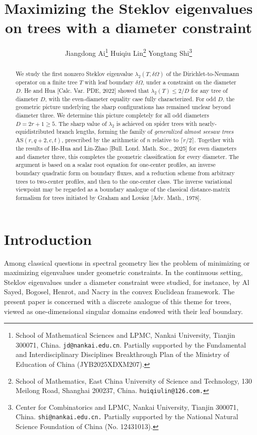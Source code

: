\documentclass[11pt]{article}
\title{Maximizing the Steklov eigenvalues on trees with a diameter constraint}
\author{
    Jiangdong Ai\thanks{School of Mathematical Sciences and LPMC, Nankai University, Tianjin 300071, China. {\tt jd@nankai.edu.cn}. Partially supported by the Fundamental and Interdisciplinary Disciplines Breakthrough Plan of the Ministry of Education of China (JYB2025XDXM207).}
    \hspace{2mm}
    Huiqiu Lin\thanks{School of Mathematics, East China University of Science and Technology, 130 Meilong Road, Shanghai 200237, China. {\tt{huiqiulin@126.com}.}}
    \hspace{2mm}
    Yongtang Shi\thanks{Center for Combinatorics and LPMC, Nankai University, Tianjin 300071, China. {\tt{shi@nankai.edu.cn.}}
    Partially supported by the National Natural Science Foundation of China (No. 12431013).}
}
\date{}
\theoremstyle{remark}
\begin{document}
\maketitle

\begin{abstract}
We study the first nonzero Steklov eigenvalue $\lambda_2(T,\delta\Omega)$
of the Dirichlet-to-Neumann operator on a finite tree $T$ with leaf boundary $\delta\Omega$, under a constraint on the diameter $D$. He and Hua [Calc. Var. PDE, 2022] showed that $\lambda_2(T) \leq 2/D$ for any tree of diameter $D$, with the even-diameter equality case fully characterized. For odd $D$, the geometric picture underlying the sharp configurations has remained unclear beyond diameter three.
We determine this picture completely for all odd diameters $D = 2r+1 \geq 5$. The sharp value of $\lambda_2$ is achieved on spider trees with nearly-equidistributed branch lengths, forming the family of \emph{generalized almost seesaw trees} $\mathrm{AS}(r,q+2,c,t)$, prescribed by the arithmetic of $n$ relative to $\lceil r/2 \rceil$.
Together with the results of He-Hua and Lin-Zhao [Bull. Lond. Math. Soc., 2025] for even diameters and diameter three, this completes the geometric classification for every diameter.
The argument is based on a scalar root equation for one-center profiles, an inverse boundary quadratic form on boundary fluxes, and a reduction scheme from arbitrary trees to two-center profiles, and then to the
one-center class. The inverse variational viewpoint may be regarded as a boundary analogue of the classical distance-matrix formalism for trees initiated by Graham and Lov\'asz [Adv. Math., 1978].
\end{abstract}


\section{Introduction}
Among classical questions in spectral geometry lies the problem of minimizing or maximizing
eigenvalues under geometric constraints. In the continuous setting, Steklov eigenvalues under a
diameter constraint were studied, for instance, by Al Sayed, Bogosel, Henrot, and Nacry
\cite{AlSayedBogoselHenrotNacry2021} in the convex Euclidean framework. The present paper is
concerned with a discrete analogue of this theme for trees, viewed as one-dimensional singular
domains endowed with their leaf boundary.
\end{document}
